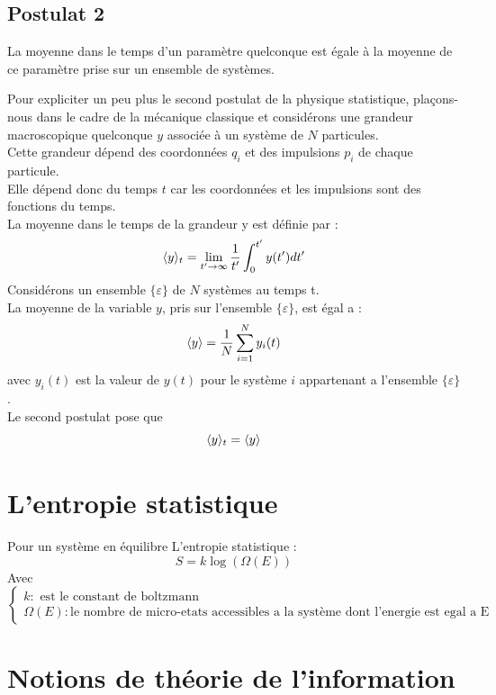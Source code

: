 \documentclass[12pt,oneside]{book}
\begin{document}
\subsection{Postulat 2}
\begin{center}
	La moyenne dans le temps d'un paramètre quelconque est égale à la moyenne de ce paramètre prise sur un ensemble de systèmes.
\end{center}
Pour expliciter un peu plus le second postulat de la physique statistique, plaçons-nous dans le cadre de la mécanique classique et considérons une grandeur macroscopique quelconque $y$ associée à un système de $N$ particules.\\
Cette grandeur dépend des coordonnées $q_i$ et des impulsions $p_i$ de chaque particule.\\
Elle dépend donc du temps $t$ car les coordonnées et les impulsions sont des fonctions du temps.\\
La moyenne dans le temps de la grandeur y est définie par :
\[ \langle y \rangle_t = \lim_{t'\to \infty}\frac{1}{t'}\int^{t'}_0y(t')dt' \]
Considérons un ensemble $\{ \varepsilon \}$ de $N$ systèmes au temps t. \\
La moyenne de la variable $y$, pris sur l'ensemble $\{ \varepsilon \}$, est égal a :
\[ \langle y \rangle = \frac{1}{N}\sum_{i=1}^N y_i(t) \]
avec $y_i(t)$ est la valeur de $y(t)$ pour le système $i$ appartenant a l'ensemble $\{ \varepsilon \}$.\\
Le second postulat pose que
\[\langle y \rangle_t = \langle y \rangle\]
\section{L'entropie statistique}
Pour un système en équilibre L'entropie statistique :
\[ S = k \log(\Omega(E)) \]
Avec $\begin{cases}
		k : \text{ est le constant de boltzmann} \\
		\Omega(E) : \text{le nombre de micro-etats accessibles a la système dont l'energie est egal a E }
	\end{cases}$
\section{Notions de théorie de l'information }
\end{document}

